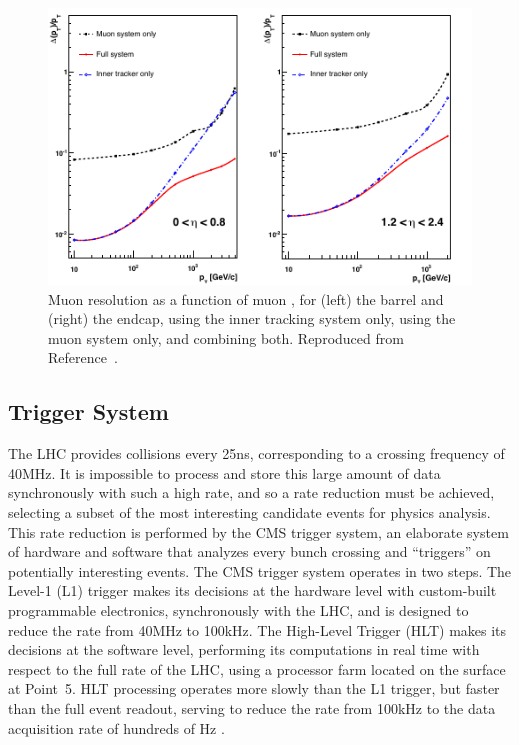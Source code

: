 \begin{figure}[tpb]
  \centering
  \includegraphics[width=\textwidth]{figures/cms/MuonMomentumResolution.pdf}
  \caption[Muon \pT resolution as a function of muon \pT for the barrel and endcap using the tracking system only, muon system only, and combining both.]{Muon \pT resolution as a function of muon \pT, for (left) the barrel and (right) the endcap, using the inner tracking system only, using the muon system only, and combining both. Reproduced from Reference~\cite{Chatrchyan:2008zzk}.}
  \label{cms:muonpT}
\end{figure}

\subsection{Trigger System}
\label{cms:trigger}
The LHC provides \pp collisions every 25\unit{ns}, corresponding to a crossing frequency of 40\unit{MHz}.
It is impossible to process and store this large amount of data synchronously with such a high rate, and so a rate reduction must be achieved, selecting a subset of the most interesting candidate events for physics analysis.
This rate reduction is performed by the CMS trigger system, an elaborate system of hardware and software that analyzes every bunch crossing and ``triggers'' on potentially interesting events.
The CMS trigger system operates in two steps.
The Level-1 (L1) trigger makes its decisions at the hardware level with custom-built programmable electronics, synchronously with the LHC, and is designed to reduce the rate from 40\unit{MHz} to 100\unit{kHz}.
The High-Level Trigger (HLT) makes its decisions at the software level, performing its computations in real time with respect to the full rate of the LHC, using a processor farm located on the surface at Point~5.
HLT processing operates more slowly than the L1 trigger, but faster than the full event readout, serving to reduce the rate from 100\unit{kHz} to the data acquisition rate of hundreds of Hz \cite{Chatrchyan:2008zzk, Adam:2005zf}.

